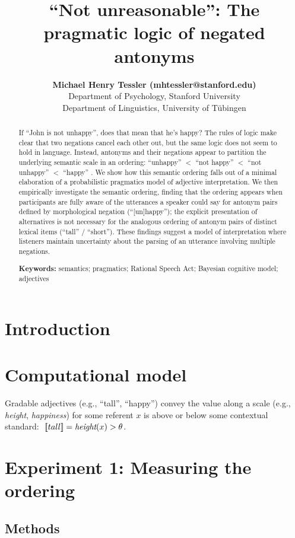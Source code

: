 \documentclass[10pt,letterpaper]{article}
\title{``Not unreasonable'': The pragmatic logic of negated antonyms}
\author{{\large \bf Michael Henry Tessler (mhtessler@stanford.edu)} \\
  Department of Psychology, Stanford University 
  \AND {\large \bf Michael Franke (mchfranke@gmail.com)} \\
  Department of Linguistics, University of T\"{u}bingen}
\newcommand{\denote}[1]{\mbox{ $[\![ #1 ]\!]$}}
\begin{document}
\maketitle


\begin{abstract}

If ``John is not unhappy'', does that mean that he's happy? 
The rules of logic make clear that two negations cancel each other out, but the same logic does not seem to hold in language. 
Instead, antonyms and their negations appear to partition the underlying semantic scale in an ordering: ``unhappy'' $<$ ``not happy'' $<$ ``not unhappy'' $<$ ``happy'' \cite{Horn1989:Natural, Krifka2007:Negated-antonyms}. 
We show how this semantic ordering falls out of a minimal elaboration of a probabilistic pragmatics model of adjective interpretation.
We then empirically investigate the semantic ordering, finding that the ordering appears when participants are fully aware of the utterances a speaker could say for antonym pairs defined by morphological negation (``[un]happy''); the explicit presentation of alternatives is not necessary for the analogous ordering of antonym pairs of distinct lexical items (``tall'' / ``short''). 
These findings suggest a model of interpretation where listeners maintain uncertainty about the parsing of an utterance involving multiple negations.


\textbf{Keywords:} 
semantics; pragmatics; Rational Speech Act; Bayesian cognitive model; adjectives
\end{abstract}


\section{Introduction}


\section{Computational model}

Gradable adjectives (e.g., ``tall'', ``happy'') convey the value along a scale (e.g., \emph{height}, \emph{happiness}) for some referent $x$ is above or below some contextual standard: $\denote{tall} = \emph{height}(x) > \theta$.

\section{Experiment 1: Measuring the ordering}
\subsection{Methods}
\end{document}
